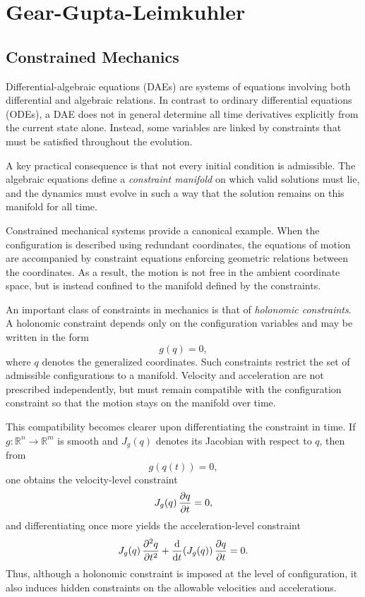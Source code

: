 \chapter{Gear-Gupta-Leimkuhler}

\section{Constrained Mechanics}

Differential-algebraic equations (DAEs) are systems of equations involving both
differential and algebraic relations. In contrast to ordinary differential
equations (ODEs), a DAE does not in general determine all time derivatives
explicitly from the current state alone. Instead, some variables are linked by
constraints that must be satisfied throughout the evolution.

A key practical consequence is that not every initial condition is admissible.
The algebraic equations define a \emph{constraint manifold} on which valid
solutions must lie, and the dynamics must evolve in such a way that the
solution remains on this manifold for all time.

Constrained mechanical systems provide a canonical example. When the
configuration is described using redundant coordinates, the equations of motion
are accompanied by constraint equations enforcing geometric relations between
the coordinates. As a result, the motion is not free in the ambient coordinate
space, but is instead confined to the manifold defined by the constraints.

An important class of constraints in mechanics is that of \emph{holonomic
constraints}. A holonomic constraint depends only on the configuration
variables and may be written in the form
\begin{equation*}
    g(q) = 0,
\end{equation*}
where \(q\) denotes the generalized coordinates. Such constraints restrict the set of admissible configurations to a manifold. Velocity and acceleration are not prescribed independently, but must remain compatible with the configuration constraint so that the motion stays on the manifold over time.

This compatibility becomes clearer upon differentiating the constraint in time.
If \(g:\mathbb{R}^n \to \mathbb{R}^m\) is smooth and \(J_g(q)\) denotes its
Jacobian with respect to \(q\), then from
\begin{equation*}
    g(q(t)) = 0,
\end{equation*}
one obtains the velocity-level constraint
\begin{equation*}
    J_g(q)\,\pdv{q}{t} = 0,
\end{equation*}
and differentiating once more yields the acceleration-level constraint
\begin{equation*}
    J_g(q)\,\pdv[2]{q}{t}
    +
    \odv{}{t}\!\left(J_g(q)\right)\pdv{q}{t}
    = 0.
\end{equation*}
Thus, although a holonomic constraint is imposed at the level of configuration, it also induces hidden constraints on the allowable velocities and accelerations.

